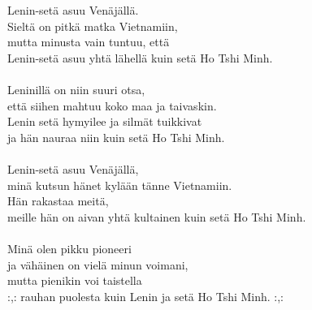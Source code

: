 
            Lenin-setä asuu Venäjällä. \\
            Sieltä on pitkä matka Vietnamiin, \\
            mutta minusta vain tuntuu, että \\
            Lenin-setä asuu yhtä lähellä kuin setä Ho Tshi Minh. \\
\hspace{10mm} \\
            Leninillä on niin suuri otsa, \\
            että siihen mahtuu koko maa ja taivaskin. \\
            Lenin setä hymyilee ja silmät tuikkivat \\
            ja hän nauraa niin kuin setä Ho Tshi Minh. \\
\hspace{10mm} \\
            Lenin-setä asuu Venäjällä, \\
            minä kutsun hänet kylään tänne Vietnamiin. \\
            Hän rakastaa meitä, \\
            meille hän on aivan yhtä kultainen kuin setä Ho Tshi Minh. \\
\hspace{10mm} \\
            Minä olen pikku pioneeri \\
            ja vähäinen on vielä minun voimani, \\
            mutta pienikin voi taistella \\
            :,: rauhan puolesta kuin Lenin ja setä Ho Tshi Minh. :,: \\
